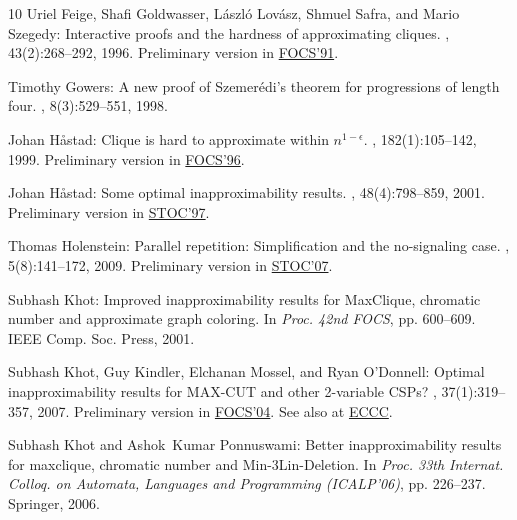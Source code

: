 \begin{thebibliography}{10}
{\sc Uriel Feige, Shafi Goldwasser, L{\'a}szl{\'o} Lov{\'a}sz, Shmuel Safra,
  and Mario Szegedy}: Interactive proofs and the hardness of approximating
  cliques.
, 43(2):268--292, 1996.
\newblock Preliminary version in
  \href{http://dx.doi.org/10.1109/SFCS.1991.185341}{FOCS'91}.
\newblock [\epfmtdoi{10.1145/226643.226652}]

{\sc Timothy Gowers}: A new proof of {S}zemer{\'e}di's theorem for progressions
  of length four.
, 8(3):529--551, 1998.
\newblock [\epfmtdoi{10.1007/s000390050065}]

{\sc Johan H{\aa}stad}: Clique is hard to approximate within $n^{1-\epsilon}$.
, 182(1):105--142, 1999.
\newblock Preliminary version in
  \href{http://dx.doi.org/10.1109/SFCS.1996.548522}{FOCS'96}.
\newblock [\epfmtdoi{10.1007/BF02392825}]

{\sc Johan H{\aa}stad}: Some optimal inapproximability results.
, 48(4):798--859, 2001.
\newblock Preliminary version in
  \href{http://dx.doi.org/10.1145/258533.258536}{STOC'97}.
\newblock [\epfmtdoi{10.1145/502090.502098}]

{\sc Thomas Holenstein}: Parallel repetition: Simplification and the
  no-signaling case.
, 5(8):141--172, 2009.
\newblock Preliminary version in
  \href{http://dx.doi.org/10.1145/1250790.1250852}{STOC'07}.

{\sc Subhash Khot}: Improved inapproximability results for {MaxClique},
  chromatic number and approximate graph coloring.
\newblock In {\em Proc. 42nd FOCS}, pp. 600--609. IEEE Comp. Soc. Press, 2001.

{\sc Subhash Khot, Guy Kindler, Elchanan Mossel, and Ryan O'Donnell}: Optimal
  inapproximability results for {MAX-CUT} and other 2-variable {CSPs}?
, 37(1):319--357, 2007.
\newblock Preliminary version in
  \href{http://dx.doi.org/10.1109/FOCS.2004.49}{FOCS'04}. See also at
  \href{http://eccc.hpi-web.de/report/2005/101/}{ECCC}.
\newblock [\epfmtdoi{10.1137/S0097539705447372}]

{\sc Subhash Khot and Ashok~Kumar Ponnuswami}: Better inapproximability results
  for maxclique, chromatic number and {M}in-3{L}in-{D}eletion.
\newblock In {\em Proc. 33th Internat. Colloq. on Automata, Languages and
  Programming (ICALP'06)}, pp. 226--237. Springer, 2006.
\newblock [\epfmtdoi{10.1007/11786986\_21}]


\end{thebibliography}

